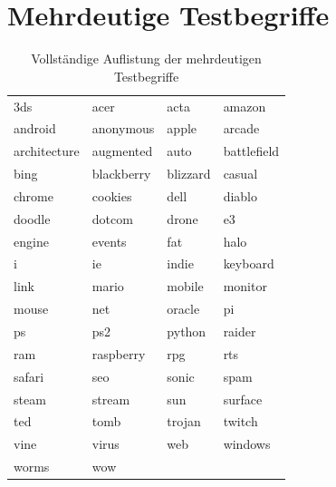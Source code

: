\documentclass[12pt,a4paper]{report}
\begin{document}
\section{Mehrdeutige Testbegriffe}
\label{sec:mehrdeutigetestbegriffe}
\begin{table}[H]
\caption{Vollständige Auflistung der mehrdeutigen Testbegriffe}
\begin{center}
\begin{tabular}{l|l|l|l}\\
3ds & acer & acta & amazon\\
android & anonymous & apple & arcade\\
architecture & augmented & auto & battlefield\\
bing & blackberry & blizzard & casual\\
chrome & cookies & dell & diablo\\
doodle & dotcom & drone & e3\\
engine & events & fat & halo\\
i & ie & indie & keyboard\\
link & mario & mobile & monitor\\
mouse & net & oracle & pi\\
ps & ps2 & python & raider\\
ram & raspberry & rpg & rts\\
safari & seo & sonic & spam\\
steam & stream & sun & surface\\
ted & tomb & trojan & twitch\\
vine & virus & web & windows\\
worms & wow &  & \\

\end{tabular}
\end{center}
\end{table}
	
\end{document}
